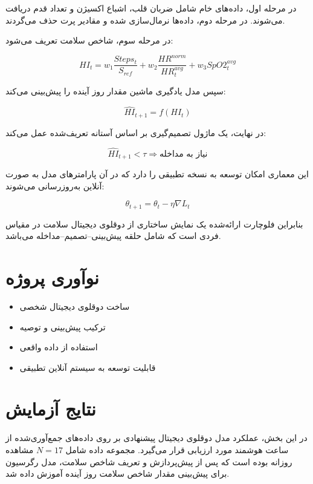 \documentclass[12pt,a4paper]{article}
\begin{document}
	در مرحله اول، داده‌های خام شامل ضربان قلب، اشباع اکسیژن و تعداد قدم دریافت می‌شوند.  
	در مرحله دوم، داده‌ها نرمال‌سازی شده و مقادیر پرت حذف می‌گردند.  
	
	در مرحله سوم، شاخص سلامت تعریف می‌شود:
	
	\[
	HI_t = w_1 \frac{Steps_t}{S_{ref}} 
	+ w_2 \frac{HR^{norm}}{HR^{avg}_t}
	+ w_3 SpO2^{avg}_t
	\]
	
	سپس مدل یادگیری ماشین مقدار روز آینده را پیش‌بینی می‌کند:
	
	\[
	\hat{HI}_{t+1} = f(HI_t)
	\]
	
	در نهایت، یک ماژول تصمیم‌گیری بر اساس آستانه تعریف‌شده عمل می‌کند:
	
	\[
	\hat{HI}_{t+1} < \tau \Rightarrow \text{نیاز به مداخله}
	\]
	
	این معماری امکان توسعه به نسخه تطبیقی را دارد که در آن پارامترهای مدل به صورت آنلاین به‌روزرسانی می‌شوند:
	
	\[
	\theta_{t+1} = \theta_t - \eta \nabla L_t
	\]
	
	بنابراین فلوچارت ارائه‌شده یک نمایش ساختاری از دوقلوی دیجیتال سلامت در مقیاس فردی است که شامل حلقه پیش‌بینی–تصمیم–مداخله می‌باشد.
	
	
	
	\section{نوآوری پروژه}
	
	\begin{itemize}
		\item ساخت دوقلوی دیجیتال شخصی
		\item ترکیب پیش‌بینی و توصیه
		\item استفاده از داده واقعی
		\item قابلیت توسعه به سیستم آنلاین تطبیقی
	\end{itemize}
	
	
\section{نتایج آزمایش}

در این بخش، عملکرد مدل دوقلوی دیجیتال پیشنهادی بر روی داده‌های جمع‌آوری‌شده از ساعت هوشمند مورد ارزیابی قرار می‌گیرد. مجموعه داده شامل $N=17$ مشاهده روزانه بوده است که پس از پیش‌پردازش و تعریف شاخص سلامت، مدل رگرسیون برای پیش‌بینی مقدار شاخص سلامت روز آینده آموزش داده شد.
\end{document}

